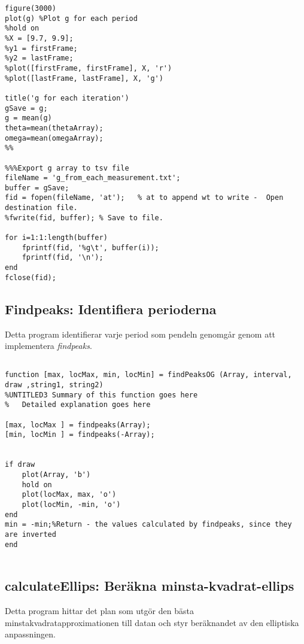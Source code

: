 \begin{lstlisting}[style=Matlab-editor]
%Take mean of g in this interval and display
figure(3000)
plot(g) %Plot g for each period
%hold on
%X = [9.7, 9.9];
%y1 = firstFrame;
%y2 = lastFrame;
%plot([firstFrame, firstFrame], X, 'r')
%plot([lastFrame, lastFrame], X, 'g')

title('g for each iteration')
gSave = g;
g = mean(g)
theta=mean(thetaArray);
omega=mean(omegaArray);
%%

%%%Export g array to tsv file
fileName = 'g_from_each_measurement.txt';
buffer = gSave;
fid = fopen(fileName, 'at');   % at to append wt to write -  Open destination file.
%fwrite(fid, buffer); % Save to file.

for i=1:1:length(buffer)
    fprintf(fid, '%g\t', buffer(i));
    fprintf(fid, '\n');    
end
fclose(fid);

\end{lstlisting}

\subsection{Findpeaks: Identifiera perioderna}

Detta program identifierar varje period som pendeln genomgår genom att implementera \textit{findpeaks}. 

\begin{lstlisting}[style=Matlab-editor]

function [max, locMax, min, locMin] = findPeaksOG (Array, interval, draw ,string1, string2)
%UNTITLED3 Summary of this function goes here
%   Detailed explanation goes here

[max, locMax ] = findpeaks(Array);
[min, locMin ] = findpeaks(-Array); 


if draw
    plot(Array, 'b')
    hold on
    plot(locMax, max, 'o')
    plot(locMin, -min, 'o')
end
min = -min;%Return - the values calculated by findpeaks, since they are inverted
end


\end{lstlisting}

\subsection{calculateEllips: Beräkna minsta-kvadrat-ellips}

Detta program hittar det plan som utgör den bästa minstakvadratapproximationen till datan och styr beräknandet av den elliptiska anpassningen. 

